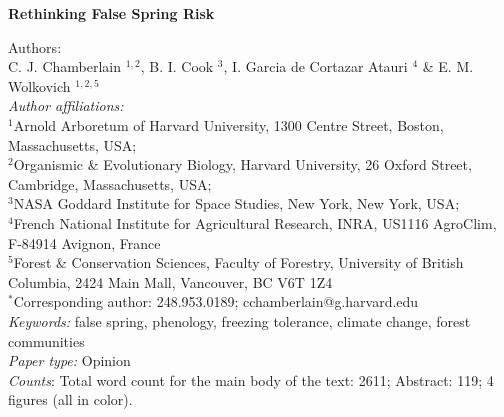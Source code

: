 \documentclass{article}\usepackage[]{graphicx}\usepackage[]{color}
\begin{document}
\noindent \textbf{\Large{Rethinking False Spring Risk}}

\noindent Authors:\\
C. J. Chamberlain $^{1,2}$, B. I. Cook $^{3}$, I. Garcia de Cortazar Atauri $^{4}$ \& E. M. Wolkovich $^{1,2,5}$
\vspace{2ex}\\
\emph{Author affiliations:}\\
$^{1}$Arnold Arboretum of Harvard University, 1300 Centre Street, Boston, Massachusetts, USA; \\
$^{2}$Organismic \& Evolutionary Biology, Harvard University, 26 Oxford Street, Cambridge, Massachusetts, USA; \\
$^{3}$NASA Goddard Institute for Space Studies, New York, New York, USA; \\
$^{4}$French National Institute for Agricultural Research, INRA, US1116 AgroClim, F-84914 Avignon, France\\
$^{5}$Forest \& Conservation Sciences, Faculty of Forestry, University of British Columbia, 2424 Main Mall, Vancouver, BC V6T 1Z4\\
\vspace{2ex}
$^*$Corresponding author: 248.953.0189; cchamberlain@g.harvard.edu\\

\noindent \emph{Keywords:} false spring, phenology, freezing tolerance, climate change, forest communities \\
\emph{Paper type:} Opinion\\
\emph{Counts}: Total word count for the main body of the text:  2611; Abstract: 119; 4 figures (all in color). \\

\renewcommand{\thetable}{\arabic{table}}
\renewcommand{\thefigure}{\arabic{figure}}
\renewcommand{\labelitemi}{$-$}


\newpage
\end{document}
